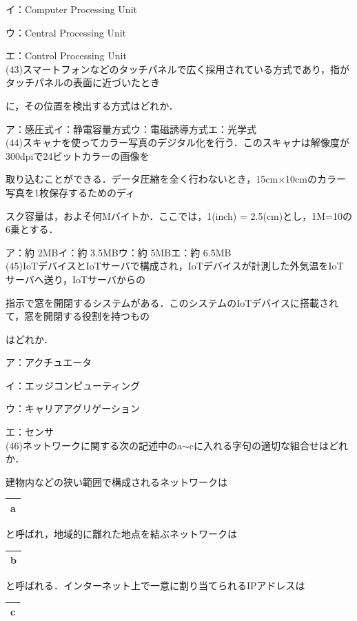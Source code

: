 イ：Computer Processing Unit\par\quad
ウ：Central Processing Unit\par\quad
エ：Control Processing Unit\\
(43)スマートフォンなどのタッチパネルで広く採用されている方式であり，指がタッチパネルの表面に近づいたとき\par\quad に，その位置を検出する方式はどれか．\par\quad
ア：感圧式\quad イ：静電容量方式\quad ウ：電磁誘導方式\quad エ：光学式\\
(44)スキャナを使ってカラー写真のデジタル化を行う．このスキャナは解像度が300dpiで24ビットカラーの画像を\par\quad 取り込むことができる．データ圧縮を全く行わないとき，15cm$\times$10cmのカラー写真を1枚保存するためのディ\par\quad スク容量は，およそ何Mバイトか．ここでは，1(inch) = 2.5(cm)とし，1M=10の6乗とする．\par\quad 
ア：約 2MB\quad イ：約 3.5MB\quad ウ：約 5MB\quad エ：約 6.5MB\\
(45)IoTデバイスとIoTサーバで構成され，IoTデバイスが計測した外気温をIoTサーバへ送り，IoTサーバからの\par\quad 指示で窓を開閉するシステムがある．このシステムのIoTデバイスに搭載されて，窓を開閉する役割を持つもの\par\quad はどれか．\par\quad
ア：アクチュエータ\par\quad
イ：エッジコンピューティング\par\quad
ウ：キャリアアグリゲーション\par\quad
エ：センサ\\
(46)ネットワークに関する次の記述中のa$\sim$cに入れる字句の適切な組合せはどれか．\par\quad
建物内などの狭い範囲で構成されるネットワークは
\noindent\begin{tabular}{|c|}
  \hline
  a \\
  \hline
\end{tabular}
と呼ばれ，地域的に離れた地点を結ぶネットワークは\par\quad
\noindent\begin{tabular}{|c|}
  \hline
  b \\
  \hline
\end{tabular}
と呼ばれる．インターネット上で一意に割り当てられるIPアドレスは
\noindent\begin{tabular}{|c|}
  \hline
  c \\
  \hline
\end{tabular}
